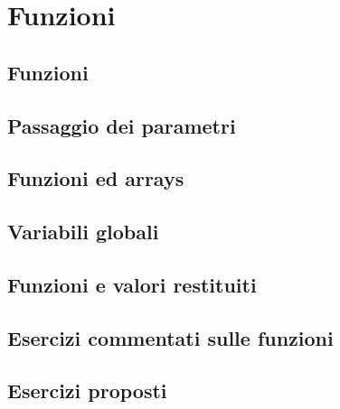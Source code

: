 \chapter{Funzioni}

\section{Funzioni}

\section{Passaggio dei parametri}

\section{Funzioni ed arrays}

\section{Variabili globali}

\section{Funzioni e valori restituiti}

\section{Esercizi commentati sulle funzioni}

\section{Esercizi proposti}

\newpage